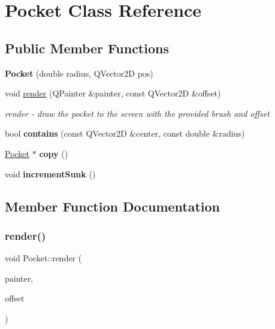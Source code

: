 \hypertarget{class_pocket}{}\section{Pocket Class Reference}
\label{class_pocket}
\subsection*{Public Member Functions}
\begin{DoxyCompactItemize}
\item 
\mbox{\label{class_pocket_a967b7b80a4a7aba6b56509d1d0e28a24}} 
{\bfseries Pocket} (double radius, Q\+Vector2D pos)
\item 
void \mbox{\hyperlink{class_pocket_ab6114f9e08389b3ccdba3676275479e7}{render}} (Q\+Painter \&painter, const Q\+Vector2D \&offset)
\begin{DoxyCompactList}\small\item\em render -\/ draw the pocket to the screen with the provided brush and offset \end{DoxyCompactList}\item 
\mbox{\label{class_pocket_ac01b76c9853e24904296d467ceeaa821}} 
bool {\bfseries contains} (const Q\+Vector2D \&center, const double \&radius)
\item 
\mbox{\label{class_pocket_a5b58653e731813f66047dd05ac3e05f0}} 
\mbox{\hyperlink{class_pocket}{Pocket}} $\ast$ {\bfseries copy} ()
\item 
\mbox{\label{class_pocket_a4ba8a5305df04f95a25a6c7027b05c2b}} 
void {\bfseries increment\+Sunk} ()
\end{DoxyCompactItemize}


\subsection{Member Function Documentation}
\mbox{\label{class_pocket_ab6114f9e08389b3ccdba3676275479e7}} 
\subsubsection{\texorpdfstring{render()}{render()}}
{\footnotesize\ttfamily void Pocket\+::render (\begin{DoxyParamCaption}\item[{Q\+Painter \&}]{painter,  }\item[{const Q\+Vector2D \&}]{offset }\end{DoxyParamCaption})}



